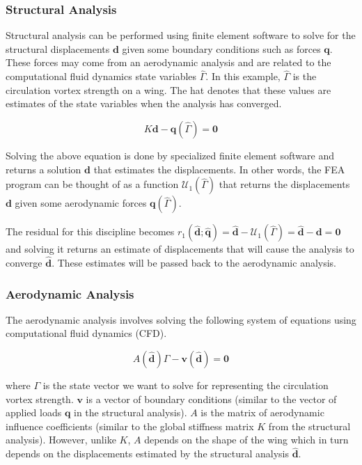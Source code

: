 \documentclass[11pt]{article}
\begin{document}
\hypertarget{structural-analysis}{%
\subsubsection{Structural Analysis}\label{structural-analysis}}

Structural analysis can be performed using finite element software to
solve for the structural displacements \(\mathbf{d}\) given some
boundary conditions such as forces \(\mathbf{q}\). These forces may come
from an aerodynamic analysis and are related to the computational fluid
dynamics state variables \(\hat{\Gamma}\). In this example,
\(\hat{\Gamma}\) is the circulation vortex strength on a wing. The hat
denotes that these values are estimates of the state variables when the
analysis has converged.

\begin{equation}
K\mathbf{d} - \mathbf{q}(\hat{\Gamma}) = \mathbf{0}
\tag{1}
\end{equation}

Solving the above equation is done by specialized finite element
software and returns a solution \({\mathbf{d}}\) that estimates the
displacements. In other words, the FEA program can be thought of as a
function \(\mathcal{U}_1(\hat{\Gamma})\) that returns the displacements
\({\mathbf{d}}\) given some aerodynamic forces
\(\mathbf{q}(\hat{\Gamma})\).

The residual for this discipline becomes
\(r_1(\hat{\mathbf{d}};\hat{\mathbf{q}}) = \hat{\mathbf{d}} - \mathcal{U}_1(\hat{\Gamma}) = \hat{\mathbf{d}} - {\mathbf{d}} = \mathbf{0}\)
and solving it returns an estimate of displacements that will cause the
analysis to converge \(\hat{\mathbf{d}}\). These estimates will be
passed back to the aerodynamic analysis.

\hypertarget{aerodynamic-analysis}{%
\subsubsection{Aerodynamic Analysis}\label{aerodynamic-analysis}}

The aerodynamic analysis involves solving the following system of
equations using computational fluid dynamics (CFD).

\begin{equation}
A(\hat{\mathbf{d}})\Gamma - \mathbf{v}(\hat{\mathbf{d}}) = \mathbf{0}
\tag{2}
\end{equation}

where \(\Gamma\) is the state vector we want to solve for representing
the circulation vortex strength. \(\mathbf{v}\) is a vector of boundary
conditions (similar to the vector of applied loads \(\mathbf{q}\) in the
structural analysis). \(A\) is the matrix of aerodynamic influence
coefficients (similar to the global stiffness matrix \(K\) from the
structural analysis). However, unlike \(K\), \(A\) depends on the shape
of the wing which in turn depends on the displacements estimated by the
structural analysis \(\hat{\mathbf{d}}\).
\end{document}

